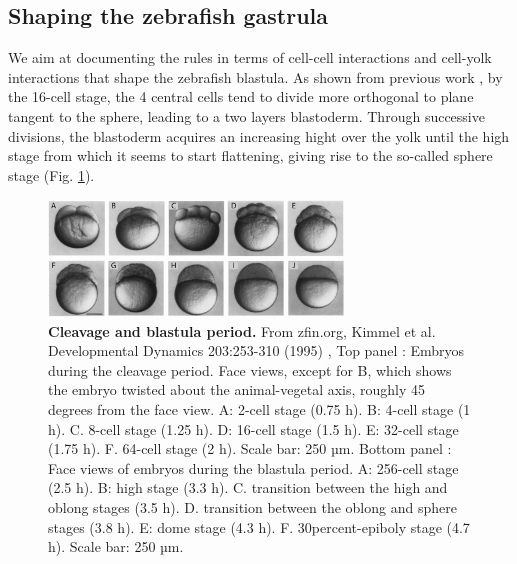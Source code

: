 \subsection{Shaping the zebrafish gastrula  }

  We aim at documenting the rules in terms of cell-cell interactions and cell-yolk interactions that shape the zebrafish blastula. As shown from previous work \cite{Olivier:2010jz}, by the 16-cell stage, the 4 central cells tend to divide more orthogonal to plane tangent to the sphere, leading to a two layers blastoderm. Through successive divisions, the blastoderm acquires an increasing hight over the yolk until the high stage from which it seems to start flattening, giving rise to the so-called sphere stage (Fig. \ref{Case_2_Cleavage_kimmel_1995}).   
\begin{figure}
\begin{center}
\includegraphics[width=0.7\textwidth]{../../images/Cases_Studies/Case_2_Cleavage/kimmel_1995.png}
\end{center}
\caption{\textbf{Cleavage and blastula period.} From zfin.org, Kimmel et al. Developmental Dynamics 203:253-310 (1995) \cite{Kimmel:1995kn}, Top panel : Embryos during the cleavage period. Face views, except for B, which shows the embryo twisted about the animal-vegetal axis, roughly 45 degrees from the face view. A: 2-cell stage (0.75 h). B: 4-cell stage (1 h). C. 8-cell stage (1.25 h). D: 16-cell stage (1.5 h). E: 32-cell stage (1.75 h). F. 64-cell stage (2 h). Scale bar: 250 µm. Bottom panel : Face views of embryos during the blastula period. A: 256-cell stage (2.5 h). B: high stage (3.3 h). C. transition between the high and oblong stages (3.5 h). D. transition between the oblong and sphere stages (3.8 h). E: dome stage (4.3 h). F. 30percent-epiboly stage (4.7 h). Scale bar: 250 µm.}
\label{Case_2_Cleavage_kimmel_1995}
\end{figure}
